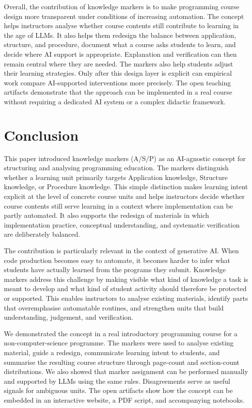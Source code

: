 \documentclass{article}
\begin{document}
Overall, the contribution of knowledge markers is to make programming course design more transparent under conditions of increasing automation. The concept helps instructors analyse whether course contents still contribute to learning in the age of LLMs. It also helps them redesign the balance between application, structure, and procedure, document what a course asks students to learn, and decide where AI support is appropriate. Explanation and verification can then remain central where they are needed. The markers also help students adjust their learning strategies. Only after this design layer is explicit can empirical work compare AI-supported interventions more precisely. The open teaching artifacts demonstrate that the approach can be implemented in a real course without requiring a dedicated AI system or a complex didactic framework.\par



\section{Conclusion}
This paper introduced knowledge markers (A/S/P) as an AI-agnostic concept for structuring and analysing programming education. The markers distinguish whether a learning unit primarily targets Application knowledge, Structure knowledge, or Procedure knowledge. This simple distinction makes learning intent explicit at the level of concrete course units and helps instructors decide whether course contents still serve learning in a context where implementation can be partly automated. It also supports the redesign of materials in which implementation practice, conceptual understanding, and systematic verification are deliberately balanced.\par

The contribution is particularly relevant in the context of generative AI. When code production becomes easy to automate, it becomes harder to infer what students have actually learned from the programs they submit. Knowledge markers address this challenge by making visible what kind of knowledge a task is meant to develop and what kind of student activity should therefore be protected or supported. This enables instructors to analyse existing materials, identify parts that overemphasise automatable routines, and strengthen units that build understanding, judgement, and verification.\par

We demonstrated the concept in a real introductory programming course for a non-computer-science programme. The markers were used to analyse existing material, guide a redesign, communicate learning intent to students, and summarise the resulting course structure through page-count and section-count distributions. We also showed that marker assignment can be performed manually and supported by LLMs using the same rules. Disagreements serve as useful signals for ambiguous units. The open artifacts show how the concept can be embedded in an interactive website, a PDF script, and accompanying notebooks.\par
\end{document}
